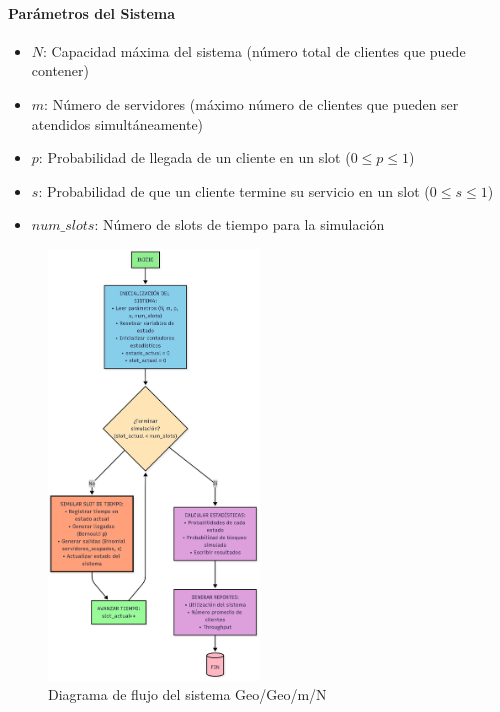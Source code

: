 \documentclass{article}
\begin{document}
\paragraph{Parámetros del Sistema}

\begin{itemize}
    \item $N$: Capacidad máxima del sistema (número total de clientes que puede contener)
    \item $m$: Número de servidores (máximo número de clientes que pueden ser atendidos simultáneamente)
    \item $p$: Probabilidad de llegada de un cliente en un slot ($0 \leq p \leq 1$)
    \item $s$: Probabilidad de que un cliente termine su servicio en un slot ($0 \leq s \leq 1$)
    \item $num\_slots$: Número de slots de tiempo para la simulación
\end{itemize}

\begin{figure}[H]
    \centering
    \includegraphics[width=0.5\textwidth]{images/flujos/GeoFlujo.png}
    \caption{Diagrama de flujo del sistema Geo/Geo/m/N}
    \label{fig:geo_geo_flujo}
\end{figure}
\end{document}
